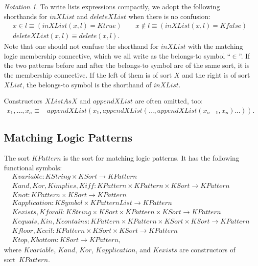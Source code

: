 \documentclass[UTF8,11pt]{article}
\newcounter{thmcounter}
\theoremstyle{plain}
\theoremstyle{definition}
\theoremstyle{remark}
\newtheorem{notation}[thmcounter]{Notation}
\newcommand{\Ktrue}{\mathit{Ktrue}}
\newcommand{\Kfalse}{\mathit{Kfalse}}
\newcommand{\KString}{\mathit{KString}}
\newcommand{\KSort}{\mathit{KSort}}
\newcommand{\KSymbol}{\mathit{KSymbol}}
\newcommand{\Kdelete}{\mathit{delete}}
\newcommand{\KPattern}{\mathit{KPattern}}
\newcommand{\KPatternList}{\mathit{KPatternList}}
\newcommand{\Kvariable}{\mathit{Kvariable}}
\newcommand{\Kand}{\mathit{Kand}}
\newcommand{\Kor}{\mathit{Kor}}
\newcommand{\Kimplies}{\mathit{Kimplies}}
\newcommand{\Kiff}{\mathit{Kiff}}
\newcommand{\Knot}{\mathit{Knot}}
\newcommand{\Kapplication}{\mathit{Kapplication}}
\newcommand{\Kexists}{\mathit{Kexists}}
\newcommand{\Kforall}{\mathit{Kforall}}
\newcommand{\Kequals}{\mathit{Kequals}}
\newcommand{\Kin}{\mathit{Kin}}
\newcommand{\Kcontains}{\mathit{Kcontains}}
\newcommand{\Ktop}{\mathit{Ktop}}
\newcommand{\Kbottom}{\mathit{Kbottom}}
\newcommand{\Kfloor}{\mathit{Kfloor}}
\newcommand{\Kceil}{\mathit{Kceil}}
\begin{document}
\begin{notation}
	To write lists expressions compactly, we adopt the following shorthands for $\mathit{inXList}$ and $\mathit{deleteXList}$ when there is no confusion:
	\begin{align*}
	&x \in l \equiv (\mathit{inXList}(x, l) = \Ktrue)
	\qquad x \not\in l \equiv (\mathit{inXList}(x, l) = \Kfalse)
	\\
	&\mathit{deleteXList}(x, l) \equiv \Kdelete(x, l).
	\end{align*}
	Note that one should not confuse the shorthand for $\mathit{inXList}$ with the 
	matching logic membership connective, which we all write as the belongs-to 
	symbol ``$\in$''. 
	If the two patterns before and after the belongs-to symbol are of the same 
	sort, it is the membership connective. 
	If the left of them is of sort $\mathit{X}$ and the right is of sort 
	$\mathit{XList}$, the belongs-to symbol is the shorthand of $\mathit{inXList}$.
	
	Constructors $\mathit{XListAsX}$ and $\mathit{appendXList}$ are often omitted, too:
	\begin{align*}
	x_1, \dots, x_n
	\equiv &\mathit{appendXList}(x_1, \mathit{appendXList}(\dots, \mathit{appendXList}(x_{n-1}, x_n)\dots)).
	\end{align*}
\end{notation}

\subsection{Matching Logic Patterns}

The sort $\KPattern$ is the sort for matching logic patterns.
It has the following functional symbols:
\begin{align*}
&\Kvariable \colon \KString \times \KSort \to 
\KPattern
\\
&\Kand, \Kor, \Kimplies, \Kiff \colon \KPattern \times \KPattern \times \KSort \to \KPattern
\\
&\Knot \colon \KPattern \times \KSort \to \KPattern 
\\
&\Kapplication \colon \KSymbol \times \KPatternList \to \KPattern 
\\
&\Kexists, \Kforall \colon \KString \times \KSort \times \KPattern \times \KSort \to \KPattern 
\\
&\Kequals, \Kin, \Kcontains \colon \KPattern \times 
\KPattern \times \KSort \times \KSort \to \KPattern \\
&\Kfloor, \Kceil \colon \KPattern \times \KSort \times \KSort \to \KPattern\\
&\Ktop, \Kbottom \colon \KSort \to \KPattern,
\end{align*}
where $\Kvariable$, $\Kand$, $\Kor$, $\Kapplication$, and $\Kexists$ are constructors of sort~$\KPattern$. 
\end{document}
